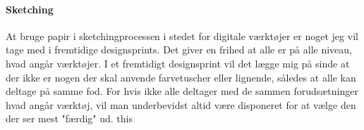 \documentclass{article}
\begin{document}
\paragraph{Sketching} At bruge papir i sketchingprocessen i stedet for digitale
værktøjer er noget jeg vil tage med i fremtidige designsprints. Det giver en
frihed at alle er på alle niveau, hvad angår værktøjer. I et fremtidigt
designsprint vil det lægge mig på sinde at der ikke er nogen der skal anvende
farvetuscher eller lignende, således at alle kan deltage på samme fod. For hvis
ikke alle deltager med de sammen forudsætninger hvad angår værktøj, vil man
underbevidst altid være disponeret for at vælge den der ser mest "færdig" ud.
this 
\end{document}
